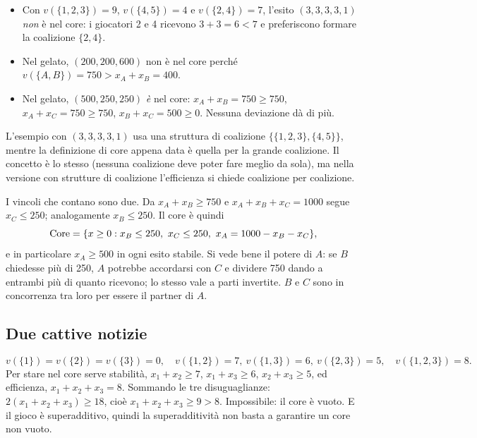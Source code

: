 \begin{esempio}
\begin{itemize}
  \item Con $v(\{1,2,3\}) = 9$, $v(\{4,5\}) = 4$ e $v(\{2,4\}) = 7$, l'esito
        $(3,3,3,3,1)$ \emph{non} è nel core: i giocatori 2 e 4 ricevono $3 + 3 = 6 < 7$ e
        preferiscono formare la coalizione $\{2,4\}$.
  \item Nel gelato, $(200,200,600)$ non è nel core perché
        $v(\{A,B\}) = 750 > x_A + x_B = 400$.
  \item Nel gelato, $(500,250,250)$ \emph{è} nel core: $x_A + x_B = 750 \ge 750$,
        $x_A + x_C = 750 \ge 750$, $x_B + x_C = 500 \ge 0$. Nessuna deviazione dà di più.
\end{itemize}
\end{esempio}

\begin{osservazione}
L'esempio con $(3,3,3,3,1)$ usa una struttura di coalizione $\{\{1,2,3\},\{4,5\}\}$, mentre la
definizione di core appena data è quella per la grande coalizione. Il concetto è lo stesso
(nessuna coalizione deve poter fare meglio da sola), ma nella versione con strutture di
coalizione l'efficienza si chiede coalizione per coalizione.
\end{osservazione}

\begin{extra}
I vincoli che contano sono due. Da $x_A + x_B \ge 750$ e $x_A + x_B + x_C = 1000$ segue
$x_C \le 250$; analogamente $x_B \le 250$. Il core è quindi
\[
  \operatorname{Core} = \{ x \ge 0 : x_B \le 250,\ x_C \le 250,\ x_A = 1000 - x_B - x_C \},
\]
e in particolare $x_A \ge 500$ in ogni esito stabile. Si vede bene il potere di $A$: se $B$
chiedesse più di 250, $A$ potrebbe accordarsi con $C$ e dividere 750 dando a entrambi più di
quanto ricevono; lo stesso vale a parti invertite. $B$ e $C$ sono in concorrenza tra loro
per essere il partner di $A$.
\end{extra}

\subsection{Due cattive notizie}

\begin{esempio}
\[
  v(\{1\}) = v(\{2\}) = v(\{3\}) = 0,\quad
  v(\{1,2\}) = 7,\ v(\{1,3\}) = 6,\ v(\{2,3\}) = 5,\quad
  v(\{1,2,3\}) = 8.
\]
Per stare nel core serve stabilità, $x_1 + x_2 \ge 7$, $x_1 + x_3 \ge 6$, $x_2 + x_3 \ge 5$,
ed efficienza, $x_1 + x_2 + x_3 = 8$. Sommando le tre disuguaglianze:
$2(x_1+x_2+x_3) \ge 18$, cioè $x_1+x_2+x_3 \ge 9 > 8$. Impossibile: il core è vuoto. E il
gioco è superadditivo, quindi la superadditività non basta a garantire un core non vuoto.
\end{esempio}

